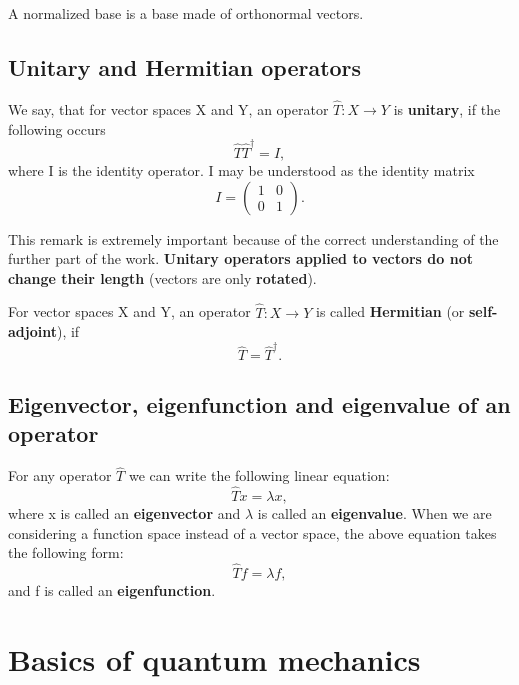 \begin{remark}
A normalized base is a base made of orthonormal vectors.
\end{remark}

\subsection{Unitary and Hermitian operators}

\begin{definition}
We say, that for vector spaces X and Y, an operator $\hat{T}: X \rightarrow Y$ is \textbf{unitary}, if the following occurs
\[ \hat{T}\hat{T}^\dagger = I, \]
where I is the identity operator. I may be understood as the identity matrix
\[ I = \begin{pmatrix} 1 & 0 \\ 0 & 1 \end{pmatrix}.  \]
\end{definition}

\begin{remark} \label{unitary_operators_no_length_change}
This remark is extremely important because of the correct understanding of the further part of the work. \textbf{Unitary operators applied to vectors do not change their length} (vectors are only \textbf{rotated}).
\end{remark}

\begin{definition}
For vector spaces X and Y, an operator $\hat{T}: X \rightarrow Y$ is called \textbf{Hermitian} (or \textbf{self-adjoint}), if
\[ \hat{T} = \hat{T}^\dagger. \]
\end{definition}

\subsection{Eigenvector, eigenfunction and eigenvalue of an operator}

\begin{definition}
For any operator $\hat{T}$ we can write the following linear equation:
\[ \hat{T} x = \lambda x, \]
where x is called an \textbf{eigenvector} and $\lambda$ is called an \textbf{eigenvalue}.
When we are considering a function space instead of a vector space, the above equation takes the following form:
\[  \hat{T} f = \lambda f, \]
and f is called an \textbf{eigenfunction}.
\end{definition}

\newpage
\section{Basics of quantum mechanics}

